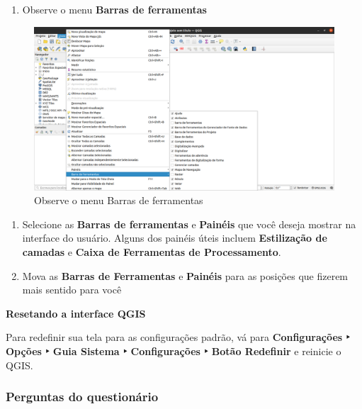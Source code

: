 \documentclass[
]{book}
\providecommand{\tightlist}{%
  \setlength{\itemsep}{0pt}\setlength{\parskip}{0pt}}
\begin{document}
\begin{enumerate}
\def\labelenumi{\arabic{enumi}.}
\setcounter{enumi}{3}
\tightlist
\item
  Observe o menu \textbf{Barras de ferramentas}
\end{enumerate}

\begin{figure}
\centering
\includegraphics{media/modulo1/ex01-03.png}
\caption{Observe o menu Barras de ferramentas}
\end{figure}

\begin{enumerate}
\def\labelenumi{\arabic{enumi}.}
\setcounter{enumi}{4}
\tightlist
\item
  Selecione as \textbf{Barras de ferramentas} e \textbf{Painéis} que você deseja mostrar na interface do usuário. Alguns dos painéis úteis incluem \textbf{Estilização de camadas} e \textbf{Caixa de Ferramentas de Processamento}.
\item
  Mova as \textbf{Barras de Ferramentas} e \textbf{Painéis} para as posições que fizerem mais sentido para você
\end{enumerate}

\textbf{Resetando a interface QGIS}

Para redefinir sua tela para as configurações padrão, vá para \textbf{Configurações ‣ Opções ‣ Guia Sistema ‣ Configurações ‣ Botão Redefinir} e reinicie o QGIS.

\hypertarget{perguntas-do-questionuxe1rio-2}{%
\subsubsection{\texorpdfstring{\textbf{Perguntas do questionário}}{Perguntas do questionário}}\label{perguntas-do-questionuxe1rio-2}}
\end{document}
